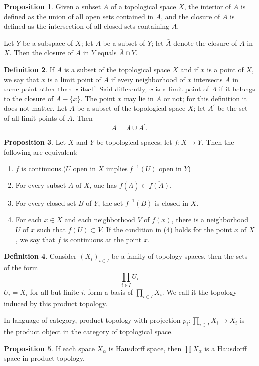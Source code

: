 \documentclass[12pt,a4paper]{book}
\newenvironment{enu}{\begin{enumerate}[(1)]}{\end{enumerate}}
\theoremstyle{definition}
\newtheorem{defn}{Definition}[section]
\newtheorem{prop}[defn]{Proposition}
\begin{document}
\begin{prop}
    Given a subset $A$ of a topological space $X$, the interior of $A$ is defined as the union of all open sets contained in $A$, and the closure of $A$ is defined as the intersection of all closed sets containing $A$.

    Let $Y$ be a subspace of $X$; let $A$ be a subset of $Y$; let $\bar{A}$ denote the closure of $A$ in $X$. Then the closure of $A$ in $Y$ equals $\bar{A} \cap Y$.
\end{prop}
\begin{defn}
    If $A$ is a subset of the topological space $X$ and if $x$ is a point of $X$, we say that $x$ is a limit point of $A$ if every neighborhood of $x$ intersects $A$ in some point other than $x$ itself. Said differently, $x$ is a limit point of $A$ if it belongs to the closure of $A-\{x\}$. The point $x$ may lie in $A$ or not; for this definition it does not matter.
    Let $A$ be a subset of the topological space $X$; let $A^{\prime}$ be the set of all limit points of $A$. Then
    $$
        \bar{A}=A \cup A^{\prime} .
    $$
\end{defn}
\begin{prop}
    Let $X$ and $Y$ be topological spaces; let $f: X \rightarrow Y$. Then the following are equivalent:
    \begin{enu}
        \item  $f$ is continuous.($U$ open in $X$ implies $f^{-1}(U)$ open in $Y$)
        \item  For every subset $A$ of $X$, one has $f(\bar{A}) \subset \overline{f(A)}$.
        \item  For every closed set $B$ of $Y$, the set $f^{-1}(B)$ is closed in $X$.
        \item  For each $x \in X$ and each neighborhood $V$ of $f(x)$, there is a neighborhood $U$ of $x$ such that $f(U) \subset V$.
        If the condition in (4) holds for the point $x$ of $X$, we say that $f$ is continuous at the point $x$.
    \end{enu}
\end{prop}
\begin{defn}
    Consider $(X_i)_{i\in I}$ be a family of topology spaces, then the sets of the form
    \begin{equation*}
        \prod_{i\in I} U_i
    \end{equation*}
    $U_i=X_i$ for all but finite $i$, form a basis of $\prod_{i\in I } X_i$. We call it the topology induced by this product topology.

    In language of category, product topology with projection $p_i: \prod_{i\in I } X_i\rightarrow X_i$ is the product object in the category of topological space.
\end{defn}
\begin{prop}
    If each space $X_\alpha$ is Hausdorff space, then $\prod X_\alpha$ is a Hausdorff space in product topology.
\end{prop}
\end{document}
